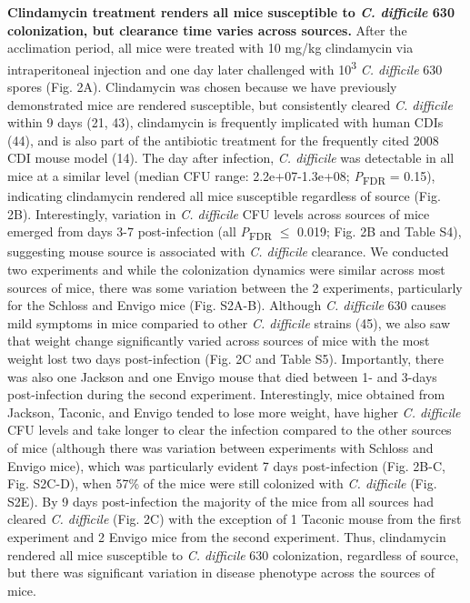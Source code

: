 \documentclass[11pt,]{article}
\begin{document}
\textbf{Clindamycin treatment renders all mice susceptible to \emph{C.
difficile} 630 colonization, but clearance time varies across sources.}
After the acclimation period, all mice were treated with 10 mg/kg
clindamycin via intraperitoneal injection and one day later challenged
with 10\textsuperscript{3} \emph{C. difficile} 630 spores (Fig. 2A).
Clindamycin was chosen because we have previously demonstrated mice are
rendered susceptible, but consistently cleared \emph{C. difficile}
within 9 days (21, 43), clindamycin is frequently implicated with human
CDIs (44), and is also part of the antibiotic treatment for the
frequently cited 2008 CDI mouse model (14). The day after infection,
\emph{C. difficile} was detectable in all mice at a similar level
(median CFU range: 2.2e+07-1.3e+08; \emph{P}\textsubscript{FDR} = 0.15),
indicating clindamycin rendered all mice susceptible regardless of
source (Fig. 2B). Interestingly, variation in \emph{C. difficile} CFU
levels across sources of mice emerged from days 3-7 post-infection (all
\emph{P}\textsubscript{FDR} \(\le\) 0.019; Fig. 2B and Table S4),
suggesting mouse source is associated with \emph{C. difficile}
clearance. We conducted two experiments and while the colonization
dynamics were similar across most sources of mice, there was some
variation between the 2 experiments, particularly for the Schloss and
Envigo mice (Fig. S2A-B). Although \emph{C. difficile} 630 causes mild
symptoms in mice comparied to other \emph{C. difficile} strains (45), we
also saw that weight change significantly varied across sources of mice
with the most weight lost two days post-infection (Fig. 2C and Table
S5). Importantly, there was also one Jackson and one Envigo mouse that
died between 1- and 3-days post-infection during the second experiment.
Interestingly, mice obtained from Jackson, Taconic, and Envigo tended to
lose more weight, have higher \emph{C. difficile} CFU levels and take
longer to clear the infection compared to the other sources of mice
(although there was variation between experiments with Schloss and
Envigo mice), which was particularly evident 7 days post-infection (Fig.
2B-C, Fig. S2C-D), when 57\% of the mice were still colonized with
\emph{C. difficile} (Fig. S2E). By 9 days post-infection the majority of
the mice from all sources had cleared \emph{C. difficile} (Fig. 2C) with
the exception of 1 Taconic mouse from the first experiment and 2 Envigo
mice from the second experiment. Thus, clindamycin rendered all mice
susceptible to \emph{C. difficile} 630 colonization, regardless of
source, but there was significant variation in disease phenotype across
the sources of mice.
\end{document}
